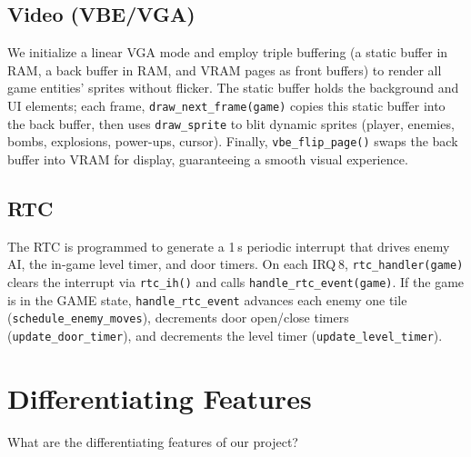 \documentclass[12pt,a4paper]{article}
\begin{document}
\subsection*{Video (VBE/VGA)}
We initialize a linear VGA mode and employ triple buffering (a static buffer in RAM, a back buffer in RAM, and VRAM pages as front buffers) to render all game entities’ sprites without flicker. The static buffer holds the background and UI elements; each frame, \texttt{draw\_next\_frame(game)} copies this static buffer into the back buffer, then uses \texttt{draw\_sprite} to blit dynamic sprites (player, enemies, bombs, explosions, power-ups, cursor). Finally, \texttt{vbe\_flip\_page()} swaps the back buffer into VRAM for display, guaranteeing a smooth visual experience.

\subsection*{RTC}
The RTC is programmed to generate a 1 s periodic interrupt that drives enemy AI, the in-game level timer, and door timers. On each IRQ 8, \texttt{rtc\_handler(game)} clears the interrupt via \texttt{rtc\_ih()} and calls \texttt{handle\_rtc\_event(game)}. If the game is in the GAME state, \texttt{handle\_rtc\_event} advances each enemy one tile (\texttt{schedule\_enemy\_moves}), decrements door open/close timers (\texttt{update\_door\_timer}), and decrements the level timer (\texttt{update\_level\_timer}).

\section{Differentiating Features}
What are the differentiating features of our project?
\end{document}
